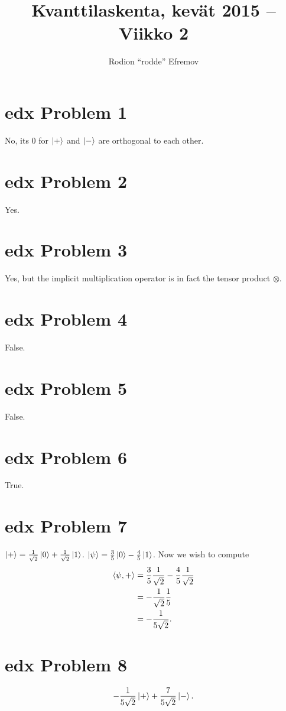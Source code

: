\documentclass[10pt]{article}
\title{Kvanttilaskenta, kevät 2015 -- Viikko 2}
\author{Rodion ``rodde'' Efremov}
\begin{document}
 \maketitle

\section*{edx Problem 1}
No, its 0 for $\ket{+}$ and $\ket{-}$ are orthogonal to each other.

\section*{edx Problem 2}
Yes.

\section*{edx Problem 3}
Yes, but the implicit multiplication operator is in fact the tensor product $\otimes$.
 
\section*{edx Problem 4}
False.

\section*{edx Problem 5}
False.

\section*{edx Problem 6}
True.

\section*{edx Problem 7}
$\ket{+} = \frac{1}{\sqrt{2}} \ket{0} + \frac{1}{\sqrt{2}} \ket{1}$. $\ket{\psi} = \frac{3}{5} \ket{0} - \frac{4}{5} \ket{1}$. Now we wish to compute
\begin{align*}
\braket{\psi, +} &= \frac{3}{5} \frac{1}{\sqrt{2}} - \frac{4}{5} \frac{1}{\sqrt{2}} \\
 						  &= -\frac{1}{\sqrt{2}} \frac{1}{5} \\
 						  &= -\frac{1}{5\sqrt{2}}.
\end{align*}

\section*{edx Problem 8}
\[
-\frac{1}{5 \sqrt{2} } \ket{+} + \frac{7}{5 \sqrt{2}} \ket{-}.
\]
\end{document}
